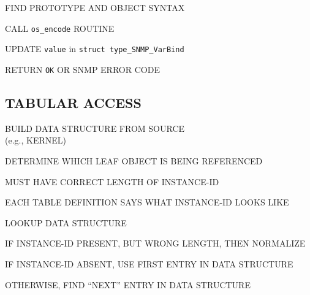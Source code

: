 \begin{bwslide}

\begin{nrtc}
\item	FIND PROTOTYPE AND OBJECT SYNTAX

\item	CALL \verb"os_encode" ROUTINE

\item	UPDATE \verb"value" in \verb"struct type_SNMP_VarBind"

\item	RETURN \verb"OK" OR SNMP ERROR CODE
\end{nrtc}
\end{bwslide}


\begin{bwslide}
\part*	{TABULAR ACCESS}\bf

\begin{nrtc}
\item	BUILD DATA STRUCTURE FROM SOURCE\\ (e.g., KERNEL)

\item	DETERMINE WHICH LEAF OBJECT IS BEING REFERENCED
\end{nrtc}
\end{bwslide}




\begin{bwslide}

\begin{nrtc}
\item	MUST HAVE CORRECT LENGTH OF INSTANCE-ID
    \begin{nrtc}
    \item	EACH TABLE DEFINITION SAYS WHAT INSTANCE-ID LOOKS LIKE
    \end{nrtc}

\item	LOOKUP DATA STRUCTURE
\end{nrtc}
\end{bwslide}


\begin{bwslide}

\begin{nrtc}
\item	IF INSTANCE-ID PRESENT, BUT WRONG LENGTH, THEN NORMALIZE

\item	IF INSTANCE-ID ABSENT, USE FIRST ENTRY IN DATA STRUCTURE

\item	OTHERWISE, FIND ``NEXT'' ENTRY IN DATA STRUCTURE
\end{nrtc}
\end{bwslide}


